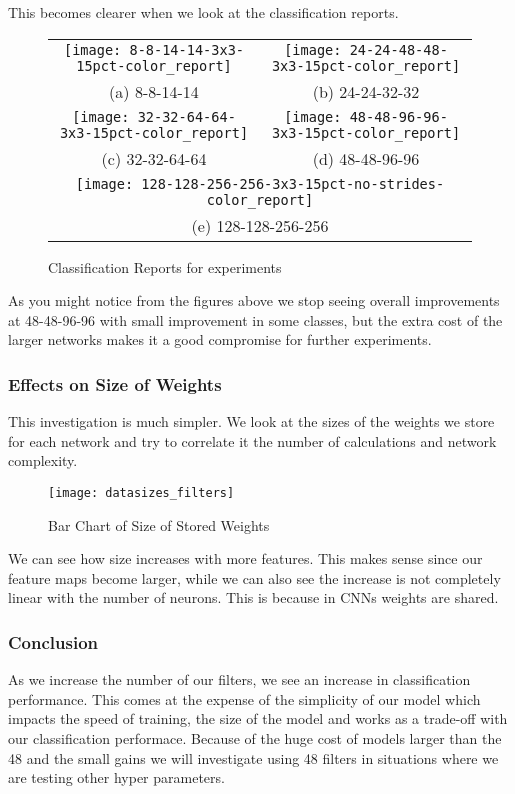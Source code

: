 This becomes clearer when we look at the classification reports.
\begin{figure}
	\begin{tabular}{cc}
		\texttt{[image: 8-8-14-14-3x3-15pct-color\_report]} &   \texttt{[image: 24-24-48-48-3x3-15pct-color\_report]} \\
		(a) 8-8-14-14 & (b) 24-24-32-32 \\[6pt]
		\texttt{[image: 32-32-64-64-3x3-15pct-color\_report]} &   \texttt{[image: 48-48-96-96-3x3-15pct-color\_report]} \\
		(c) 32-32-64-64 & (d) 48-48-96-96 \\[6pt]
		\multicolumn{2}{c}{\texttt{[image: 128-128-256-256-3x3-15pct-no-strides-color\_report]} }\\
		\multicolumn{2}{c}{(e) 128-128-256-256}
	\end{tabular}
\caption{Classification Reports for experiments}
\end{figure}

As you might notice from the figures above we stop seeing overall improvements at 48-48-96-96 with small improvement in some classes, but the extra cost of the larger networks makes it a good compromise for further experiments.

\subsubsection{Effects on Size of Weights}
This investigation is much simpler. We look at the sizes of the weights we store for each network and try to correlate it the number of calculations and network complexity.

\begin{figure}
	\texttt{[image: datasizes\_filters]}
	\caption{Bar Chart of Size of Stored Weights}
\end{figure}

We can see how size increases with  more features. This makes sense since our feature maps become larger, while we can also see the increase is not completely linear with the number of neurons. This is because in CNNs weights are shared.

\subsubsection{Conclusion}
As we increase the number of our filters, we see an increase in classification performance. This comes at the expense of the simplicity of our model which impacts the speed of training, the size of the model and works as a trade-off with our classification performace.  Because of the huge cost of models larger than the 48 and the small gains we will investigate using 48 filters in situations where we are testing other hyper parameters.

